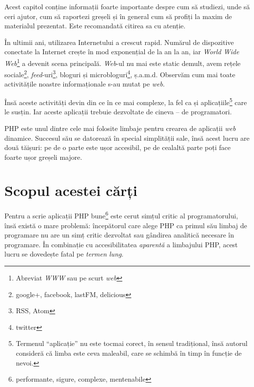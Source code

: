 
\begin{chapsummary}

Acest capitol conține informații foarte importante despre cum să studiezi, unde
să ceri ajutor, cum să raportezi greșeli și în general cum să profiți la maxim
de materialul prezentat. Este recomandată citirea sa cu atenție.

\end{chapsummary}

În ultimii ani, utilizarea Internetului a crescut rapid. Numărul de dispozitive
conectate la Internet crește în mod exponențial de la an la an, iar
\textsl{World Wide Web}\footnote{Abreviat
    \textsl{WWW} sau pe scurt
    \textsl{web}}
a devenit scena principală. \textit{Web}-ul nu mai este static demult, avem
rețele sociale\footnote{google+, facebook, lastFM, delicious},
\textsl{feed}-uri\footnote{RSS,%
Atom},
bloguri și microbloguri\footnote{twitter}, ș.a.m.d. Observăm cum mai
toate activitățile noastre informaționale s-au mutat pe \textit{web}.

Însă aceste activități devin din ce în ce mai complexe, la fel ca și
aplicațiile\footnote{Termenul ``aplicație'' nu este tocmai corect, în sensul
tradițional, însă autorul consideră că limba este ceva maleabil, care se
schimbă în timp în funcție de nevoi.} care le susțin.  Iar aceste aplicații
trebuie dezvoltate de cineva -- de programatori.

PHP este unul dintre cele mai folosite limbaje pentru crearea de aplicații
\textit{web} dinamice. Succesul său se datorează în special simplității sale,
însă acest lucru are două tăișuri: pe de o parte este ușor accesibil, pe de
cealaltă parte poți face foarte ușor greșeli majore.

\section*{Scopul acestei cărți}
{}

Pentru a scrie aplicații PHP bune\footnote{performante, sigure, complexe,
mentenabile} este cerut simțul critic al programatorului, însă există o mare
problemă: începătorul care alege PHP ca primul său limbaj de programare nu are
un simț critic dezvoltat sau gândirea analitică necesare în programare. În
combinație cu accesibilitatea \textit{aparentă} a limbajului PHP, acest lucru
se dovedește fatal pe \textit{termen lung}.

